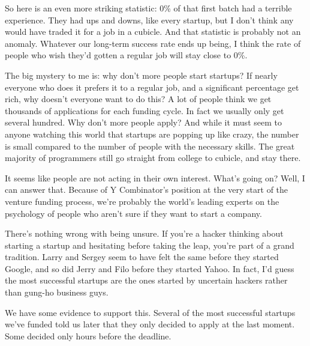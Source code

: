 So here
                    is an even more striking statistic: 0\% of that first batch
                    had a terrible experience. They had ups and downs, like
                    every startup, but I don't think any would have traded it
                    for a job in a cubicle. And that statistic is probably not
                    an anomaly. Whatever our long-term success rate ends up
                    being, I think the rate of people who wish they'd gotten a
                    regular job will stay close to 0\%.

The big
                    mystery to me is: why don't more people start startups? If
                    nearly everyone who does it prefers it to a regular job, and
                    a significant percentage get rich, why doesn't everyone want
                    to do this? A lot of people think we get thousands of
                    applications for each funding cycle. In fact we usually only
                    get several hundred. Why don't more people apply? And while
                    it must seem to anyone watching this world that startups are
                    popping up like crazy, the number is small compared to the
                    number of people with the necessary skills. The great
                    majority of programmers still go straight from college to
                    cubicle, and stay there.

It seems like people are
                    not acting in their own interest. What's going on? Well, I
                    can answer that. Because of Y Combinator's position at the
                    very start of the venture funding process, we're probably
                    the world's leading experts on the psychology of people who
                    aren't sure if they want to start a company.

There's
                    nothing wrong with being unsure. If you're a hacker thinking
                    about starting a startup and hesitating before taking the
                    leap, you're part of a grand tradition. Larry and Sergey
                    seem to have felt the same before they started Google, and
                    so did Jerry and Filo before they started Yahoo. In fact,
                    I'd guess the most successful startups are the ones started
                    by uncertain hackers rather than gung-ho business guys.

We
                    have some evidence to support this. Several of the most
                    successful startups we've funded told us later that they
                    only decided to apply at the last moment. Some decided only
                    hours before the deadline.

